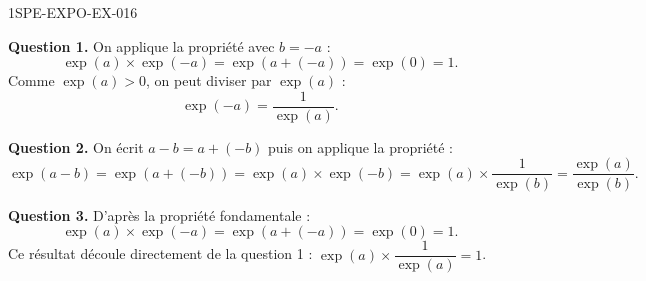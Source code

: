 \begin{corrige}{1SPE-EXPO-EX-016}

\textbf{Question 1.} On applique la propriété avec $b = -a$ :
\[
\exp(a) \times \exp(-a) = \exp(a + (-a)) = \exp(0) = 1.
\]
Comme $\exp(a) > 0$, on peut diviser par $\exp(a)$ :
\[
\exp(-a) = \frac{1}{\exp(a)}.
\]

\textbf{Question 2.} On écrit $a - b = a + (-b)$ puis on applique la propriété :
\[
\exp(a - b) = \exp(a + (-b)) = \exp(a) \times \exp(-b) = \exp(a) \times \frac{1}{\exp(b)} = \frac{\exp(a)}{\exp(b)}.
\]

\textbf{Question 3.} D'après la propriété fondamentale :
\[
\exp(a) \times \exp(-a) = \exp(a + (-a)) = \exp(0) = 1.
\]
Ce résultat découle directement de la question 1 : $\exp(a) \times \dfrac{1}{\exp(a)} = 1$.
\end{corrige}
